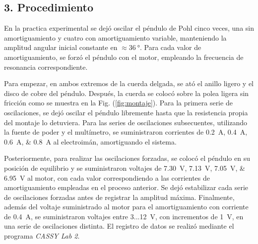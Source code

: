 \subsection*{3. Procedimiento}
En la practica experimental se dejó oscilar el péndulo de Pohl cinco veces, una sin
amortiguamiento y cuatro con amortiguamiento variable, manteniendo la amplitud angular
inicial constante en $\approx\qty{36}{\degree}$. Para cada valor de amortiguamiento, se
forzó el péndulo con el motor, empleando la frecuencia de resonancia correspondiente.

Para empezar, en ambos extremos de la cuerda delgada, se ató el anillo ligero y el
disco de cobre del péndulo. Después, la cuerda se colocó sobre la polea ligera sin fricción
como se muestra en la Fig. (\ref{fig:montaje}). Para la primera serie de oscilaciones, se
dejó oscilar el péndulo libremente hasta que la resistencia propia del montaje lo detuviera.
Para las series de oscilaciones subsecuentes, utilizando la fuente de poder y el multímetro,
se suministraron corrientes de \qtylist{0,2;0,4;0,6;0,8}{\ampere} al electroimán, amortiguando
el sistema. 

Posteriormente, para realizar las oscilaciones forzadas, se colocó el péndulo en su posición de
equilibrio y se suministraron voltajes de \qtylist{7,30;7,13;7,05;6,95}{\volt} al motor,
con cada valor correspondiendo a las corrientes de amortiguamiento empleadas en el proceso
anterior. Se dejó estabilizar cada serie de oscilaciones forzadas antes de registrar la
amplitud máxima. Finalmente, además del voltaje suministrado al motor para el amortiguamiento
con corriente de \qty{0,4}{\ampere}, se suministraron voltajes entre 3...\qty{12}{\volt}, con
incrementos de \qty{1}{\volt}, en una serie de oscilaciones distinta. El registro de datos se
realizó mediante el programa \textit{CASSY Lab 2}.